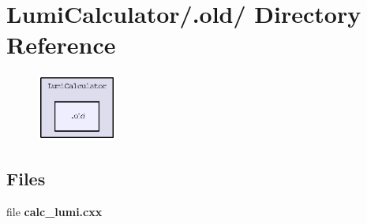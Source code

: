 \section{Lumi\-Calculator/.old/ Directory Reference}
\label{dir_f27661db26513b2a52f4bf24f31bf5b2}


\begin{figure}[H]
\begin{center}
\leavevmode
\includegraphics[width=74pt]{dir_f27661db26513b2a52f4bf24f31bf5b2_dep}
\end{center}
\end{figure}
\subsection*{Files}
\begin{CompactItemize}
\item 
file \textbf{calc\_\-lumi.cxx}
\end{CompactItemize}
